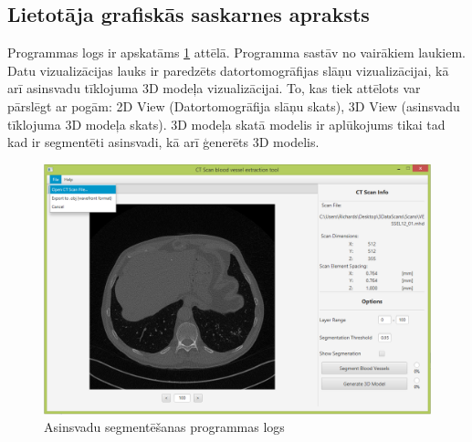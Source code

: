 \subsection{Lietotāja grafiskās saskarnes apraksts}
Programmas logs ir apskatāms \ref{fig:vessel-extractor} attēlā. Programma sastāv no vairākiem laukiem.  Datu vizualizācijas lauks ir paredzēts datortomogrāfijas slāņu vizualizācijai, kā arī asinsvadu tīklojuma 3D modeļa vizualizācijai. To, kas tiek attēlots var pārslēgt ar pogām: 2D View (Datortomogrāfija slāņu skats), 3D View (asinsvadu tīklojuma 3D modeļa skats). 3D modeļa skatā modelis ir aplūkojums tikai tad kad ir segmentēti asinsvadi, kā arī ģenerēts 3D modelis.
\begin{figure}[h]
\begin{center}
\includegraphics[scale=0.5]{img/vessel-extractor.png}
\caption{Asinsvadu segmentēšanas programmas logs}
\label{fig:vessel-extractor}
\end{center}
\end{figure}

